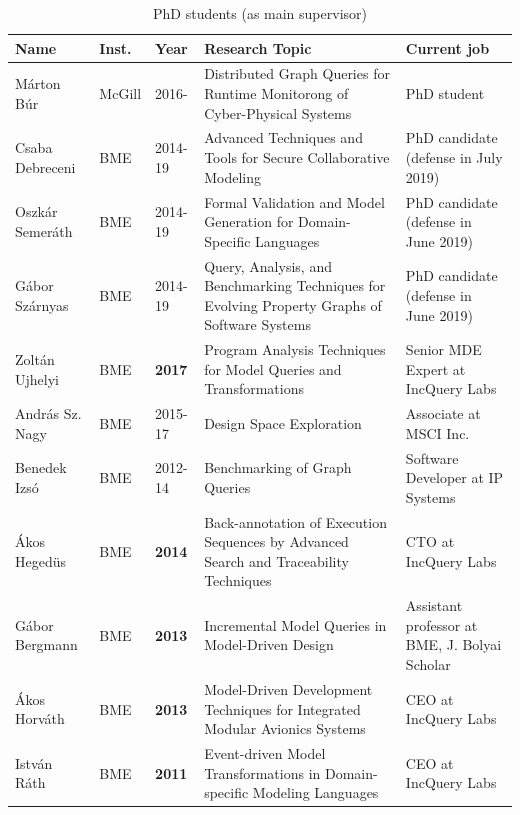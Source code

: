 \documentclass{xetexCV}
\begin{document}
\begin{table}[htb]
\begin{tabular}{@{}lllp{6cm}p{4cm}@{}}
\toprule
\textbf{Name} & \textbf{Inst.} & \textbf{Year} & \textbf{Research Topic} & \textbf{Current job} \\ \midrule
M\'arton B\'ur   & McGill  & 2016-   & Distributed Graph Queries for Runtime Monitorong of Cyber-Physical Systems & PhD student \\
Csaba Debreceni & BME  & 2014-19 &  Advanced Techniques and Tools
for Secure Collaborative Modeling & PhD candidate \newline (defense in July 2019)\\
Oszk\'ar Semer\'ath & BME  & 2014-19 &  Formal Validation and Model Generation
for Domain-Specific Languages & PhD candidate \newline (defense in June 2019)\\
G\'abor Sz\'arnyas & BME  & 2014-19 &  Query, Analysis, and Benchmarking Techniques
for Evolving Property Graphs of Software Systems & PhD candidate \newline (defense in June 2019)\\
Zolt\'an Ujhelyi & BME  & \textbf{2017} &  Program Analysis Techniques for Model Queries and Transformations & Senior MDE Expert at IncQuery Labs\\
Andr\'as Sz. Nagy & BME  & 2015-17 & Design Space Exploration & Associate at MSCI Inc.\\
Benedek Izs\'o & BME  & 2012-14 &  Benchmarking of Graph Queries & Software Developer at IP Systems\\
\'Akos Heged\"us & BME  & \textbf{2014} &  Back-annotation of Execution Sequences by Advanced Search and Traceability Techniques & CTO at IncQuery Labs\\
G\'abor Bergmann & BME  & \textbf{2013}   &  Incremental Model Queries
in Model-Driven Design & Assistant professor at BME, J. Bolyai Scholar \\
\'Akos Horv\'ath & BME  & \textbf{2013} &  Model-Driven Development Techniques for
Integrated Modular Avionics Systems & CEO at IncQuery Labs \\
Istv\'an R\'ath   & BME  &  \textbf{2011} & Event-driven Model Transformations in
Domain-specific Modeling Languages & CEO at IncQuery Labs \\ \bottomrule
\end{tabular}
\caption{PhD students (as main supervisor)}
\label{tab:phd-supervised}
\end{table}
\end{document}
